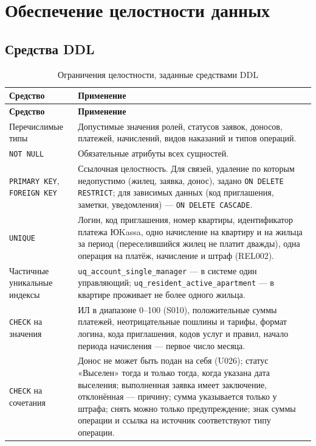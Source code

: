 \documentclass[12pt,a4paper]{article}
\begin{document}
\section{Обеспечение целостности данных}\label{sec:integrity}

\subsection{Средства DDL}

\begin{longtable}{L{48.4mm} L{112.8mm}}
\caption{Ограничения целостности, заданные средствами DDL}\label{tab:ddl}\\
\toprule \textbf{Средство} & \textbf{Применение} \\ \midrule
\endfirsthead
\toprule \textbf{Средство} & \textbf{Применение} \\ \midrule
\endhead
\bottomrule
\endfoot
Перечислимые типы & Допустимые значения ролей, статусов заявок, доносов, платежей, начислений, видов наказаний и типов операций. \\
\texttt{NOT NULL} & Обязательные атрибуты всех сущностей. \\
\texttt{PRIMARY KEY}, \texttt{FOREIGN KEY} & Ссылочная целостность. Для связей, удаление по которым недопустимо (жилец, заявка, донос), задано \texttt{ON DELETE RESTRICT}; для зависимых данных (код приглашения, заметки, уведомления) --- \texttt{ON DELETE CASCADE}. \\
\texttt{UNIQUE} & Логин, код приглашения, номер квартиры, идентификатор платежа ЮKassa, одно начисление на квартиру и на жильца за период (переселившийся жилец не платит дважды), одна операция на платёж, начисление и штраф (REL002). \\
Частичные уникальные индексы & \texttt{uq\_\allowbreak{}account\_\allowbreak{}single\_\allowbreak{}manager} --- в системе один управляющий; \texttt{uq\_\allowbreak{}resident\_\allowbreak{}active\_\allowbreak{}apartment} --- в квартире проживает не более одного жильца. \\
\texttt{CHECK} на значения & ИЛ в диапазоне 0--100 (S010), положительные суммы платежей, неотрицательные пошлины и тарифы, формат логина, кода приглашения, кодов услуг и правил, начало периода начисления --- первое число месяца. \\
\texttt{CHECK} на сочетания & Донос не может быть подан на себя (U026); статус «Выселен» тогда и только тогда, когда указана дата выселения; выполненная заявка имеет заключение, отклонённая --- причину; сумма указывается только у штрафа; снять можно только предупреждение; знак суммы операции и ссылка на источник соответствуют типу операции. \\
\end{longtable}
\end{document}
